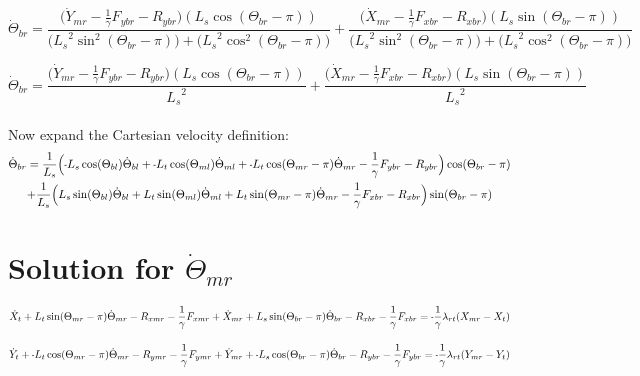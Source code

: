 \documentclass[11pt, landscape]{article}
\newcommand{\mn}{\scalebox{0.7}[1.0]{-}}
\begin{document}
\begin{equation}
\dot{\Theta}_{br} =
\frac{\Big(\dot{Y}_{mr} - \frac{1}{\gamma}F_{ybr} - R_{ybr} \Big)(L_{s}\cos(\Theta_{br}-\pi))}
{\Big( {L_{s}}^2\sin^2(\Theta_{br}-\pi)\Big) + \Big ({L_{s}}^2\cos^2(\Theta_{br}-\pi) \Big)}
+ \frac{\Big(\dot{X}_{mr} - \frac{1}{\gamma}F_{xbr} - R_{xbr} \Big)(L_{s}\sin(\Theta_{br}-\pi))}
{\Big ({L_{s}}^2\sin^2(\Theta_{br}-\pi) \Big) + \Big( {L_{s}}^2\cos^2(\Theta_{br}-\pi) \Big) }
\end{equation}

\begin{equation}
\dot{\Theta}_{br} =
\frac{\Big(\dot{Y}_{mr} - \frac{1}{\gamma}F_{ybr} - R_{ybr} \Big)(L_{s}\cos(\Theta_{br}-\pi))}
{{L_{s}}^2}
+ \frac{\Big(\dot{X}_{mr} - \frac{1}{\gamma}F_{xbr} - R_{xbr} \Big)(L_{s}\sin(\Theta_{br}-\pi))}
{{L_{s}}^2}
\end{equation}
\\
Now expand the Cartesian velocity definition: \\

\begin{multline}
\dot{\Theta}_{br} =
\frac{1}{L_{s}}\Big(\mn L_{s}\cos(\Theta_{bl})\dot{\Theta}_{bl} + \mn L_{t}\cos(\Theta_{ml})\dot{\Theta}_{ml} + \mn L_{t}\cos(\Theta_{mr}-\pi)\dot{\Theta}_{mr} - \frac{1}{\gamma}F_{ybr} - R_{ybr} \Big)\cos(\Theta_{br}-\pi) \\
+ \frac{1}{L_{s}}\Big(L_{s}\sin(\Theta_{bl})\dot{\Theta}_{bl} + L_{t}\sin(\Theta_{ml})\dot{\Theta}_{ml} + L_{t}\sin(\Theta_{mr}-\pi)\dot{\Theta}_{mr} - \frac{1}{\gamma}F_{xbr} - R_{xbr} \Big)\sin(\Theta_{br}-\pi)
\end{multline}


\section{Solution for $\dot{\Theta}_{mr}$}

\begin{equation}
\dot{X}_{t } + L_{t}\sin(\Theta_{mr}-\pi)  \dot{\Theta}_{mr} - R_{xmr} - \frac{1}{\gamma}F_{xmr} + 
\dot{X}_{mr} + L_{s}\sin(\Theta_{br}-\pi)  \dot{\Theta}_{br} - R_{xbr} - \frac{1}{\gamma}F_{xbr} = \mn\frac{1}{\gamma}\lambda_{rt}(X_{mr} - X_{t })
\end{equation}

\begin{equation}
\dot{Y}_{t } + \mn L_{t}\cos(\Theta_{mr}-\pi)  \dot{\Theta}_{mr} - R_{ymr} - \frac{1}{\gamma}F_{ymr} +
\dot{Y}_{mr} + \mn L_{s}\cos(\Theta_{br}-\pi)  \dot{\Theta}_{br} - R_{ybr} - \frac{1}{\gamma}F_{ybr} = \mn\frac{1}{\gamma}\lambda_{rt}(Y_{mr} - Y_{t })
\end{equation}
\end{document}
